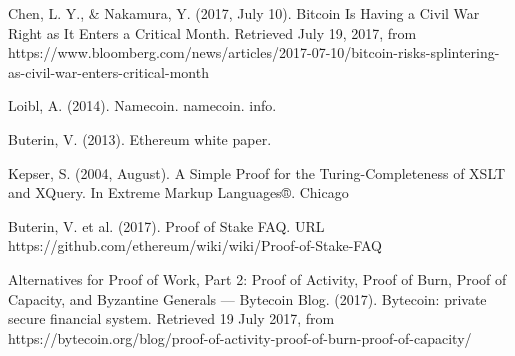 \begin{thebibliography}{99}
Chen, L. Y., \& Nakamura, Y. (2017, July 10). Bitcoin Is Having a Civil War Right as It Enters a Critical Month. Retrieved July 19, 2017, from https://www.bloomberg.com/news/articles/2017-07-10/bitcoin-risks-splintering-as-civil-war-enters-critical-month

Loibl, A. (2014). Namecoin. namecoin. info.

Buterin, V. (2013). Ethereum white paper.

Kepser, S. (2004, August). A Simple Proof for the Turing-Completeness of XSLT and XQuery. In Extreme Markup Languages®.
Chicago 

Buterin, V. et al. (2017). Proof of Stake FAQ. URL https://github.com/ethereum/wiki/wiki/Proof-of-Stake-FAQ

Alternatives for Proof of Work, Part 2: Proof of Activity, Proof of Burn, Proof of Capacity, and Byzantine Generals — Bytecoin Blog. (2017). Bytecoin: private secure financial system. Retrieved 19 July 2017, from https://bytecoin.org/blog/proof-of-activity-proof-of-burn-proof-of-capacity/

\end{thebibliography}
